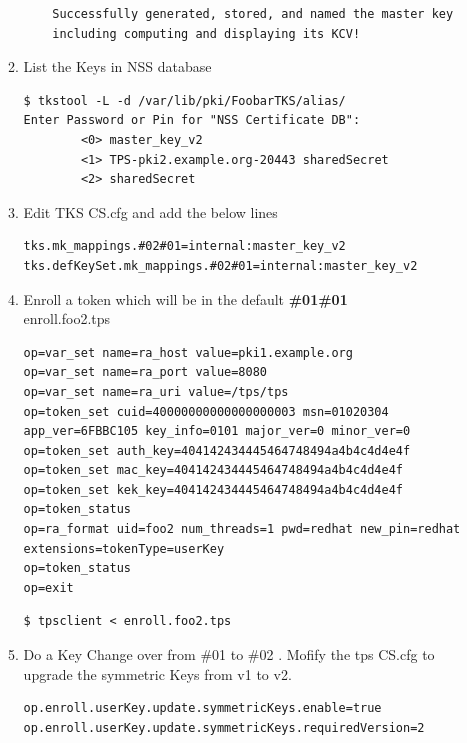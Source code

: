\documentclass[12pt]{report}
\begin{document}
\begin{enumerate}[label*=\arabic*.]
\begin{enumerate}[label*=\arabic*.]
\begin{lstlisting}
    Successfully generated, stored, and named the master key
    including computing and displaying its KCV!
                    \end{lstlisting}
                \item List the Keys in NSS database
                    \begin{lstlisting}[style=bashInputStyle]
$ tkstool -L -d /var/lib/pki/FoobarTKS/alias/                    
Enter Password or Pin for "NSS Certificate DB":
        <0> master_key_v2
        <1> TPS-pki2.example.org-20443 sharedSecret
        <2> sharedSecret
                    \end{lstlisting}
                \item Edit TKS CS.cfg and add the below lines
                    \begin{lstlisting}
tks.mk_mappings.#02#01=internal:master_key_v2
tks.defKeySet.mk_mappings.#02#01=internal:master_key_v2
                    \end{lstlisting}
                \item Enroll a token which will be in the default \textbf{\#01\#01} \\
                    enroll.foo2.tps
                    \begin{lstlisting}[style=configFile]
op=var_set name=ra_host value=pki1.example.org
op=var_set name=ra_port value=8080
op=var_set name=ra_uri value=/tps/tps
op=token_set cuid=40000000000000000003 msn=01020304 app_ver=6FBBC105 key_info=0101 major_ver=0 minor_ver=0
op=token_set auth_key=404142434445464748494a4b4c4d4e4f
op=token_set mac_key=404142434445464748494a4b4c4d4e4f
op=token_set kek_key=404142434445464748494a4b4c4d4e4f
op=token_status
op=ra_format uid=foo2 num_threads=1 pwd=redhat new_pin=redhat extensions=tokenType=userKey
op=token_status
op=exit
                    \end{lstlisting}
                    \begin{lstlisting}[style=bashInputStyle]
$ tpsclient < enroll.foo2.tps
                    \end{lstlisting}
                \item Do a Key Change over from \#01 to \#02 . Mofify the tps CS.cfg to upgrade the symmetric Keys from v1 to v2.
                    \begin{lstlisting}
op.enroll.userKey.update.symmetricKeys.enable=true
op.enroll.userKey.update.symmetricKeys.requiredVersion=2
                    \end{lstlisting}
                    \begin{lstlisting}[style=bashInputStyle]

\end{lstlisting}
\end{enumerate}
\end{enumerate}
\end{document}
